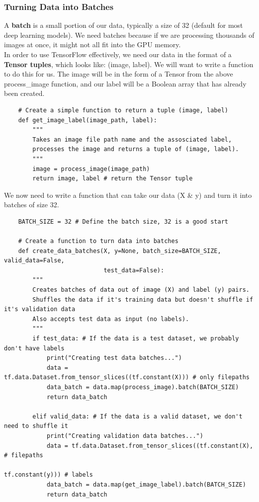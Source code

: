 \documentclass[11pt, a4paper]{article}
\begin{document}
\begin{spacing}{1.1}
	\subsubsection{Turning Data into Batches}
	A \textbf{batch} is a small portion of our data, typically a size of 32 (default for most deep learning models). We need batches because if we are processing thousands of images at once, it might not all fit into the GPU memory. \vspace*{1mm} \\
	In order to use TensorFlow effectively, we need our data in the format of a \textbf{Tensor tuples}, which looks like: (image, label). We will want to write a function to do this for us. The image will be in the form of a Tensor from the above process\_image function, and our label will be a Boolean array that has already been created. 
	\begin{lstlisting}
	# Create a simple function to return a tuple (image, label)
	def get_image_label(image_path, label):
		"""
		Takes an image file path name and the assosciated label,
		processes the image and returns a tuple of (image, label).
		"""
		image = process_image(image_path)
		return image, label # return the Tensor tuple \end{lstlisting} \vspace*{1mm}
	We now need to write a function that can take our data (X \& y) and turn it into batches of size 32. \newpage

	\begin{lstlisting}
	BATCH_SIZE = 32 # Define the batch size, 32 is a good start
	
	# Create a function to turn data into batches
	def create_data_batches(X, y=None, batch_size=BATCH_SIZE, valid_data=False, 
	                        test_data=False):
		"""
		Creates batches of data out of image (X) and label (y) pairs.
		Shuffles the data if it's training data but doesn't shuffle if it's validation data
		Also accepts test data as input (no labels).
		"""
		if test_data: # If the data is a test dataset, we probably don't have labels
			print("Creating test data batches...")
			data = tf.data.Dataset.from_tensor_slices((tf.constant(X))) # only filepaths
			data_batch = data.map(process_image).batch(BATCH_SIZE)
			return data_batch
		
		elif valid_data: # If the data is a valid dataset, we don't need to shuffle it
			print("Creating validation data batches...")
			data = tf.data.Dataset.from_tensor_slices((tf.constant(X), # filepaths
			                                           tf.constant(y))) # labels
			data_batch = data.map(get_image_label).batch(BATCH_SIZE)
			return data_batch
		

\end{lstlisting}
\end{spacing}
\end{document}
